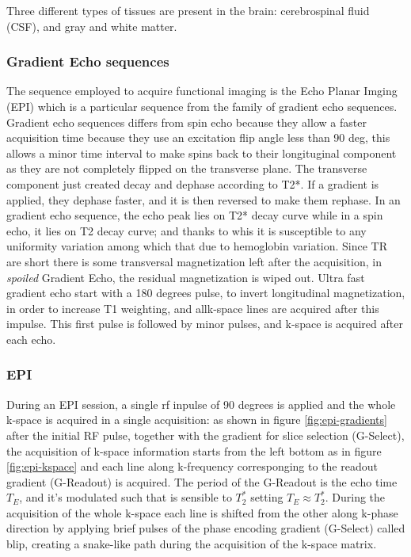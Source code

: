 \documentclass[a4paper,11pt]{article}
\begin{document}
Three different types of tissues are present in the brain: cerebrospinal fluid (CSF), and gray and white matter.
\subsubsection{Gradient Echo sequences}
The sequence employed to acquire functional imaging is the Echo Planar Imging (EPI) which is a particular sequence from the family of gradient echo sequences.
Gradient echo sequences differs from spin echo because they allow a faster acquisition time because they use an excitation flip angle less than 90 deg, this allows a minor time interval to make spins back to their longituginal component as they are not completely flipped on the transverse plane.
The transverse component just created decay and dephase according to T2*. If a gradient is applied, they dephase faster, and it is then reversed to make them rephase.
In an gradient echo sequence, the echo peak lies on T2* decay curve while in a spin echo, it lies on T2 decay curve; and thanks to whis it is susceptible to any uniformity variation among which that due to hemoglobin variation.
Since TR are short there is some transversal magnetization left after the acquisition, in \emph{spoiled} Gradient Echo, the residual magnetization is wiped out.
Ultra fast gradient echo start with a 180 degrees pulse, to invert longitudinal magnetization, in order to increase T1 weighting, and allk-space lines are acquired after this impulse. This first pulse is followed by minor pulses, and k-space is acquired after each echo.


\subsubsection{EPI}
During an EPI session, a single rf inpulse of 90 degrees is applied and the whole k-space is acquired in a single acquisition:
as shown in figure \ref{fig:epi-gradients} after the initial RF pulse, together with the gradient for slice selection (G-Select), the acquisition of k-space information starts from the left bottom as in figure \ref{fig:epi-kspace} and each line along k-frequency corresponging to the readout gradient (G-Readout) is acquired.
The period of the G-Readout is the echo time $T_E$, and it's modulated such that is sensible to $T_2^{\ast}$ setting $T_E \approx T_2^{\ast}$.
During the acquisition of the whole k-space each line is shifted from the other along k-phase direction by applying brief pulses of the phase encoding gradient (G-Select) called blip, creating a snake-like path during the acquisition of the k-space matrix.
\end{document}
